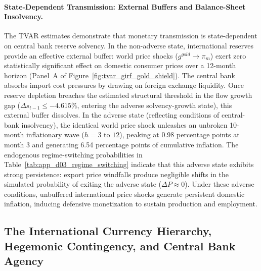 \paragraph{State-Dependent Transmission: External Buffers and Balance-Sheet Insolvency.}
The TVAR estimates demonstrate that monetary transmission is state-dependent on central bank reserve solvency. In the non-adverse state, international reserves provide an effective external buffer: world price shocks ($g^{gold} \to \pi_m$) exert zero statistically significant effect on domestic consumer prices over a 12-month horizon (Panel~A of Figure~\ref{fig:tvar_girf_gold_shield}). The central bank absorbs import cost pressures by drawing on foreign exchange liquidity. Once reserve depletion breaches the estimated structural threshold in the flow growth gap ($\Delta s_{t-1} \le -4.615\%$, entering the adverse solvency-growth state), this external buffer dissolves. In the adverse state (reflecting conditions of central-bank insolvency), the identical world price shock unleashes an unbroken 10-month inflationary wave ($h=3$ to $12$), peaking at 0.98 percentage points at month 3 and generating 6.54 percentage points of cumulative inflation. The endogenous regime-switching probabilities in Table~\ref{tab:app_d03_regime_switching} indicate that this adverse state exhibits strong persistence: export price windfalls produce negligible shifts in the simulated probability of exiting the adverse state ($\Delta P \approx 0$). Under these adverse conditions, unbuffered international price shocks generate persistent domestic inflation, inducing defensive monetization to sustain production and employment.

\subsection{The International Currency Hierarchy, Hegemonic Contingency, and Central Bank Agency}
\label{sec:currency_hierarchy_agency}

